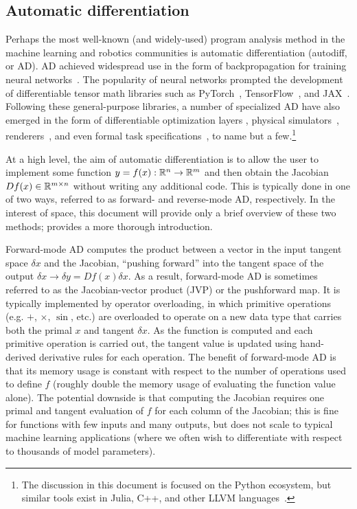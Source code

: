 \subsection{Automatic differentiation}

Perhaps the most well-known (and widely-used) program analysis method in the machine learning and robotics communities is automatic differentiation (autodiff, or AD). AD achieved widespread use in the form of backpropagation for training neural networks~\cite{rumelhartLearningRepresentationsBackpropagating1986}. The popularity of neural networks prompted the development of differentiable tensor math libraries such as PyTorch~\cite{pytorch}, TensorFlow~\cite{tensorflow2015-whitepaper}, and JAX~\cite{jax2018github}. Following these general-purpose libraries, a number of specialized AD have also emerged in the form of differentiable optimization layers \cite{agrawalDifferentiableConvexOptimization2019}, physical simulators~\cite{huDiffTaichiDifferentiableProgramming2019}, renderers~\cite{huDiffTaichiDifferentiableProgramming2019,lelidecDifferentiableRenderingPerturbed2021}, and even formal task specifications~\cite{leungBackPropagationSignalTemporal2021}, to name but a few.\footnote{The discussion in this document is focused on the Python ecosystem, but similar tools exist in Julia, C++, and other LLVM languages~\cite{NEURIPS2020_9332c513}.}

At a high level, the aim of automatic differentiation is to allow the user to implement some function $y = f(x): \mathbb{R}^n \rightarrow \mathbb{R}^m$ and then obtain the Jacobian $Df(x) \in \mathbb{R}^{m\times n}$ without writing any additional code. This is typically done in one of two ways, referred to as forward- and reverse-mode AD, respectively. In the interest of space, this document will provide only a brief overview of these two methods; \cite{AutodiffCookbookJAX} provides a more thorough introduction.

Forward-mode AD computes the product between a vector in the input tangent space $\delta x$ and the Jacobian, ``pushing forward'' into the tangent space of the output $\delta x \rightarrow \delta y = Df(x) \delta x$. As a result, forward-mode AD is sometimes referred to as the Jacobian-vector product (JVP) or the pushforward map. It is typically implemented by operator overloading, in which primitive operations (e.g. $+$, $\times$, $\sin$, etc.) are overloaded to operate on a new data type that carries both the primal $x$ and tangent $\delta x$. As the function is computed and each primitive operation is carried out, the tangent value is updated using hand-derived derivative rules for each operation. The benefit of forward-mode AD is that its memory usage is constant with respect to the number of operations used to define $f$ (roughly double the memory usage of evaluating the function value alone). The potential downside is that computing the Jacobian requires one primal and tangent evaluation of $f$ for each column of the Jacobian; this is fine for functions with few inputs and many outputs, but does not scale to typical machine learning applications (where we often wish to differentiate with respect to thousands of model parameters).

